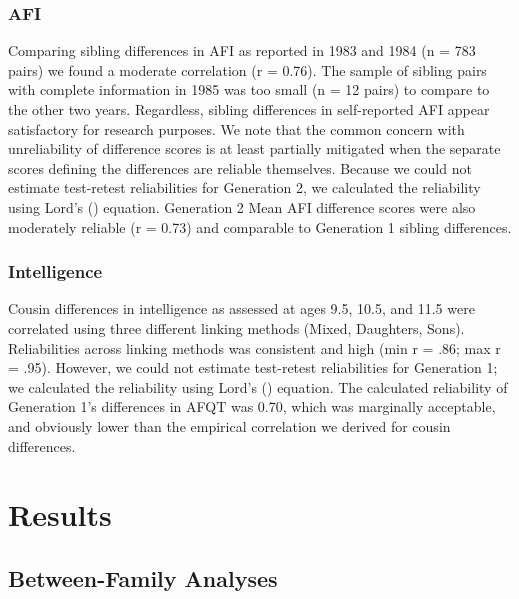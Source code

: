 \documentclass[a4paper,man,apacite,natbib,12pt,longtable,mask]{apa6}\usepackage[]{graphicx}\usepackage[]{color}
\begin{document}
\subsubsection{AFI} Comparing sibling differences in AFI as reported in 1983 and 1984 (n = 783 pairs) we found a moderate correlation (r = 0.76). The sample of sibling pairs with complete information in 1985 was too small (n = 12 pairs) to compare to the other two years. Regardless, sibling differences in self-reported AFI appear satisfactory for research purposes. We note that the common concern with unreliability of difference scores is at least partially mitigated when the separate scores defining the differences are reliable themselves. Because we could not estimate test-retest reliabilities for Generation 2, we calculated the reliability using Lord's (\citeyear{Lord1963}) equation. Generation 2 Mean AFI difference scores were also moderately reliable (r = 0.73) and comparable to Generation 1 sibling differences.

\subsubsection{Intelligence} Cousin differences in intelligence as assessed at ages 9.5, 10.5, and 11.5 were correlated using three different linking methods (Mixed, Daughters, Sons). Reliabilities across linking methods was consistent and high (min r = .86; max r = .95). However, we could not estimate test-retest reliabilities for Generation 1; we calculated the reliability using Lord's (\citeyear{Lord1963}) equation. The calculated reliability of Generation 1's differences in AFQT was 0.70, which was marginally acceptable, and obviously lower than the empirical correlation we derived for cousin differences.%
\section{Results}

%
\subsection{Between-Family Analyses}

\end{document}
